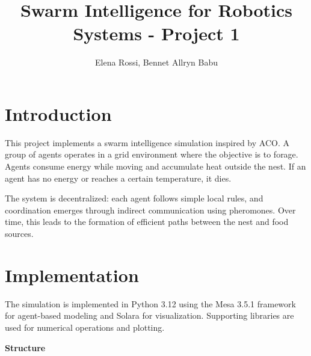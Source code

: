 \documentclass[11pt]{article}
\title{Swarm Intelligence for Robotics Systems - Project 1}
\author{Elena Rossi, Bennet Allryn Babu}
\date{}
\begin{document}
\maketitle

\section{Introduction}


This project implements a swarm intelligence simulation inspired by ACO. %
A group of agents operates in a grid environment where the objective is to forage. %
Agents consume energy while moving and accumulate heat outside the nest. If an agent has no energy or reaches a certain temperature, it dies.%

The system is decentralized: %
each agent follows simple local rules, and coordination emerges through indirect communication using pheromones. %
Over time, this leads to the formation of efficient paths between the nest and food sources.



\section{Implementation}

The simulation is implemented in Python 3.12 using the Mesa 3.5.1 framework for agent-based modeling and Solara for %
visualization. %
Supporting libraries %
are used for numerical operations and plotting.

\textbf{Structure}

\end{document}
